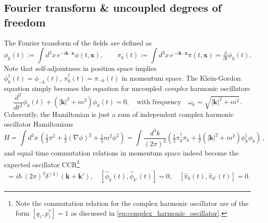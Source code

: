 \documentclass[../QFT_main.tex]{subfiles}
\begin{document}
\subsection{Fourier transform \& uncoupled degrees of freedom}


\begin{mytheorem}
%  
The Fourier transform of the fields are defined as
\begin{equation}
    \phi_k(t) :=\int d^3 x\, e^{-i \mathbf{k} \cdot \mathbf{x}} \phi(t, \mathbf{x}), \qquad \pi_k(t) := \int d^3 x\, e^{-i \mathbf{k} \cdot \mathbf{x}} \pi(t, \mathbf{x}) = \tfrac{\partial }{\partial t}\phi_k(t).
\end{equation}
Note that self-adjointness in position space implies $\phi_k^{\dagger}(t) = \phi_{-k}(t), \,\pi_k^{\dagger}(t) = \pi_{-k}(t)$ in momentum space.
%
The Klein-Gordon equation simply becomes the equation for uncoupled \emph{complex} harmonic oscillators
\begin{equation}
    \frac{d^2 }{dt^2}\phi_k(t) + (|\mathbf{k}|^2 + m^2) \phi_k(t) = 0, \quad \text{with frequency}\quad \omega_k = \sqrt{|\mathbf{k}|^2 + m^2}.
\end{equation}
Coherently, the Hamiltonian is just a sum of independent complex harmonic oscillator Hamiltonians
\begin{equation}\label{eq:hamiltonian_fourier_space}
    H  = \int d^3x\,\left(\tfrac{1}{2} \pi^2 + \tfrac{1}{2} (\nabla \phi)^2 + \tfrac{1}{2} m^2 \phi^2\right) = \int \frac{d^3 k}{(2\pi)^3} \left( \tfrac{1}{2} \pi_k^\dagger\pi_k + \tfrac{1}{2} (|\mathbf{k}|^2 + m^2) \phi_k^\dagger \phi_{k} \right)\,,
\end{equation}
and equal time commutation relations in momentum space indeed become the expected oscillator CCR\footnote{Note the commutation relation for the complex harmonic oscillator are of the form $[q_z,p_z^*]=1$ as discussed in \eqref{eq:complex_harmonic_oscillator}.}
\begin{align}
    [\hat{\phi}_k(t), \hat{\pi}_{k'}(t)] = i\hbar\, (2\pi)^3 \delta^{(3)}(\mathbf{k} + \mathbf{k}'), \quad
    [\hat{\phi}_k(t), \hat{\phi}_{k'}(t)] = 0, \quad
    [\hat{\pi}_k(t), \hat{\pi}_{k'}(t)] = 0.
\end{align}


\end{mytheorem}
\end{document}
